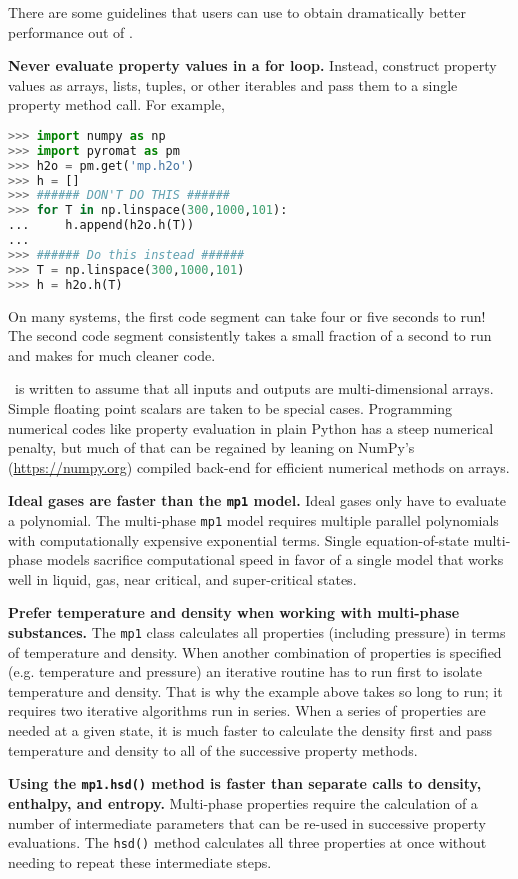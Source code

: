 There are some guidelines that users can use to obtain dramatically better performance out of \PM.

{\bf Never evaluate property values in a for loop.}  Instead, construct property values as arrays, lists, tuples, or other iterables and pass them to a single property method call.  For example,
\begin{lstlisting}[language=Python]
>>> import numpy as np
>>> import pyromat as pm
>>> h2o = pm.get('mp.h2o')
>>> h = []
>>> ###### DON'T DO THIS ######
>>> for T in np.linspace(300,1000,101):
...     h.append(h2o.h(T))
... 
>>> ###### Do this instead ######
>>> T = np.linspace(300,1000,101)
>>> h = h2o.h(T)
\end{lstlisting}
On many systems, the first code segment can take four or five seconds to run!  The second code segment consistently takes a small fraction of a second to run and makes for much cleaner code.

\PM\ is written to assume that all inputs and outputs are multi-dimensional arrays.  Simple floating point scalars are taken to be special cases.  Programming numerical codes like property evaluation in plain Python has a steep numerical penalty, but much of that can be regained by leaning on NumPy's (\url{https://numpy.org}) compiled back-end for efficient numerical methods on arrays.

{\bf Ideal gases are faster than the \texttt{mp1} model.}  Ideal gases only have to evaluate a polynomial.  The multi-phase \texttt{mp1} model requires multiple parallel polynomials with computationally expensive exponential terms.  Single equation-of-state multi-phase models sacrifice computational speed in favor of a single model that works well in liquid, gas, near critical, and super-critical states.

{\bf Prefer temperature and density when working with multi-phase substances.}  The \texttt{mp1} class calculates all properties (including pressure) in terms of temperature and density.  When another combination of properties is specified (e.g. temperature and pressure) an iterative routine has to run first to isolate temperature and density.  That is why the example above takes so long to run; it requires two iterative algorithms run in series.  When a series of properties are needed at a given state, it is much faster to calculate the density first and pass temperature and density to all of the successive property methods.

{\bf Using the \texttt{mp1.hsd()} method is faster than separate calls to density, enthalpy, and entropy.}  Multi-phase properties require the calculation of a number of intermediate parameters that can be re-used in successive property evaluations.  The \texttt{hsd()} method calculates all three properties at once without needing to repeat these intermediate steps.
